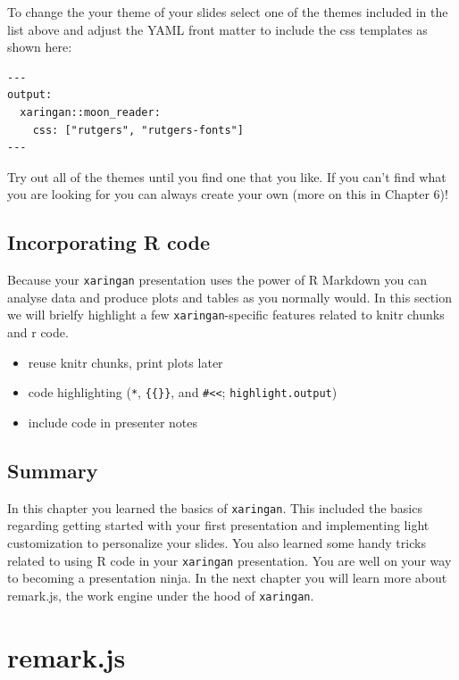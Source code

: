 \documentclass[
]{book}
\providecommand{\tightlist}{%
  \setlength{\itemsep}{0pt}\setlength{\parskip}{0pt}}
\begin{document}
To change the your theme of your slides select one of the themes included in the list above and adjust the YAML front matter to include the css templates as shown here:

\begin{verbatim}
---
output:
  xaringan::moon_reader:
    css: ["rutgers", "rutgers-fonts"]
---
\end{verbatim}

Try out all of the themes until you find one that you like. If you can't find what you are looking for you can always create your own (more on this in Chapter 6)!

\hypertarget{incorporating-r-code}{%
\section{Incorporating R code}\label{incorporating-r-code}}

Because your \texttt{xaringan} presentation uses the power of R Markdown you can analyse data and produce plots and tables as you normally would. In this section we will brielfy highlight a few \texttt{xaringan}-specific features related to knitr chunks and r code.

\begin{itemize}
\tightlist
\item
  reuse knitr chunks, print plots later
\item
  code highlighting (\texttt{*}, \texttt{\{\{\}\}}, and \texttt{\#\textless{}\textless{}}; \texttt{highlight.output})
\item
  include code in presenter notes
\end{itemize}

\hypertarget{summary}{%
\section{Summary}\label{summary}}

In this chapter you learned the basics of \texttt{xaringan}. This included the basics regarding getting started with your first presentation and implementing light customization to personalize your slides. You also learned some handy tricks related to using R code in your \texttt{xaringan} presentation. You are well on your way to becoming a presentation ninja. In the next chapter you will learn more about remark.js, the work engine under the hood of \texttt{xaringan}.

\hypertarget{remarkjs}{%
\chapter{remark.js}\label{remarkjs}}
\end{document}
